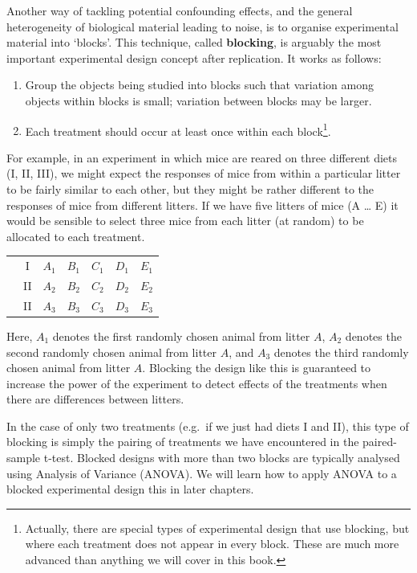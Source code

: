 \documentclass[
]{book}
\begin{document}
Another way of tackling potential confounding effects, and the general heterogeneity of biological material leading to noise, is to organise experimental material into `blocks'. This technique, called \textbf{blocking}, is arguably the most important experimental design concept after replication. It works as follows:

\begin{enumerate}
\def\labelenumi{\arabic{enumi}.}
\item
  Group the objects being studied into blocks such that variation among objects within blocks is small; variation between blocks may be larger.
\item
  Each treatment should occur at least once within each block\footnote{Actually, there are special types of experimental design that use blocking, but where each treatment does not appear in every block. These are much more advanced than anything we will cover in this book.}.
\end{enumerate}

For example, in an experiment in which mice are reared on three different diets (I, II, III), we might expect the responses of mice from within a particular litter to be fairly similar to each other, but they might be rather different to the responses of mice from different litters. If we have five litters of mice (A \ldots{} E) it would be sensible to select three mice from each litter (at random) to be allocated to each treatment.

\begin{longtable}[]{@{}lcccccc@{}}
\toprule()
\endhead
& I & \(A_{1}\) & \(B_{1}\) & \(C_{1}\) & \(D_{1}\) & \(E_{1}\) \\
& II & \(A_{2}\) & \(B_{2}\) & \(C_{2}\) & \(D_{2}\) & \(E_{2}\) \\
& II & \(A_{3}\) & \(B_{3}\) & \(C_{3}\) & \(D_{3}\) & \(E_{3}\) \\
\bottomrule()
\end{longtable}

Here, \(A_{1}\) denotes the first randomly chosen animal from litter \(A\), \(A_{2}\) denotes the second randomly chosen animal from litter \(A\), and \(A_{3}\) denotes the third randomly chosen animal from litter \(A\). Blocking the design like this is guaranteed to increase the power of the experiment to detect effects of the treatments when there are differences between litters.

In the case of only two treatments (e.g.~if we just had diets I and II), this type of blocking is simply the pairing of treatments we have encountered in the paired-sample t-test. Blocked designs with more than two blocks are typically analysed using Analysis of Variance (ANOVA). We will learn how to apply ANOVA to a blocked experimental design this in later chapters.
\end{document}
